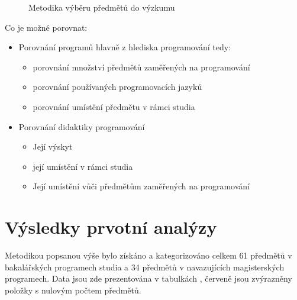 \documentclass[FP,DP]{tulthesis}
\begin{document}
{{{{{{{\begin{figure}[h!]
\caption{Metodika výběru předmětů do výzkumu} \label{mode}
\end{figure}

Co je možné porovnat:
\begin{itemize}
\item Porovnání programů hlavně z hlediska programování tedy:
\begin{itemize}
\item porovnání množství předmětů zaměřených na programování
\item porovnání používaných programovacích jazyků
\item porovnání umístění předmětu v rámci studia
\end{itemize}
\item Porovnání didaktiky programování
\begin{itemize}
\item Její výskyt
\item její umístění v rámci studia
\item Její umístění vůči předmětům zaměřených na programování
\end{itemize}


\end{itemize}
\clearpage

\section{Výsledky prvotní analýzy}
Metodikou popsanou výše bylo získáno a kategorizováno celkem 61 předmětů v bakalářských programech studia a 34 předmětů v navazujících  magisterských programech. Data jsou zde prezentována v tabulkách , červeně jsou zvýrazněny položky s nulovým počtem předmětů. 
}}}}}}}
\end{document}
